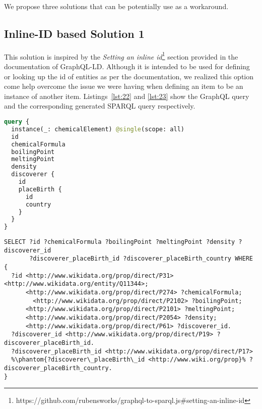 We propose three solutions that can be potentially use as a workaround. 

\subsection{Inline-ID based Solution 1}

This solution is inspired by the \textit{Setting an inline id}\footnote{https://github.com/rubensworks/graphql-to-sparql.js\#setting-an-inline-id} section provided in the documentation of GraphQL-LD. Although it is intended to be used for defining or looking up the id of entities as per the documentation, we realized this option come help overcome the issue we were having when defining an item to be an instance of another item. Listings~\ref{lst:22} and \ref{lst:23} show the GraphQL query and the corresponding generated SPARQL query respectively. 

\begin{minipage}{\linewidth}
\begin{lstlisting}[label=lst:22, caption={GraphQL Query using Solution 1}, language=GraphQL]
query {
  instance(_: chemicalElement) @single(scope: all)
  id
  chemicalFormula
  boilingPoint
  meltingPoint
  density
  discoverer {
    id
    placeBirth {
      id
      country
    }
  }
}
\end{lstlisting}
\end{minipage}

\begin{minipage}{\linewidth}
\begin{lstlisting}[columns=fullflexible, label=lst:23, caption={Generated SPARQL Query}, language=SPARQL]
SELECT ?id ?chemicalFormula ?boilingPoint ?meltingPoint ?density ?discoverer_id
       ?discoverer_placeBirth_id ?discoverer_placeBirth_country WHERE {
  ?id <http://www.wikidata.org/prop/direct/P31> <http://www.wikidata.org/entity/Q11344>;
      <http://www.wikidata.org/prop/direct/P274> ?chemicalFormula;
    	<http://www.wikidata.org/prop/direct/P2102> ?boilingPoint;
      <http://www.wikidata.org/prop/direct/P2101> ?meltingPoint;
      <http://www.wikidata.org/prop/direct/P2054> ?density;
      <http://www.wikidata.org/prop/direct/P61> ?discoverer_id.
  ?discoverer_id <http://www.wikidata.org/prop/direct/P19> ?discoverer_placeBirth_id.
  ?discoverer_placeBirth_id <http://www.wikidata.org/prop/direct/P17>
  %\phantom{?discoverer\_placeBirth\_id <http://www.wiki.org/prop}% ?discoverer_placeBirth_country.
}
\end{lstlisting}
\end{minipage}

